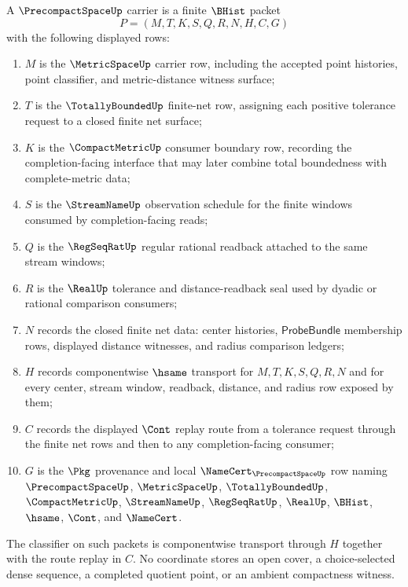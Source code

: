 \begin{definition}
\label{def:precompact-space-carrier}
A $\PrecompactSpaceUp$ carrier is a finite $\BHist$ packet
$$
P=(M,T,K,S,Q,R,N,H,C,G)
$$
with the following displayed rows:
\begin{enumerate}
\item $M$ is the $\MetricSpaceUp$ carrier row, including the accepted point histories, point classifier, and metric-distance witness surface;
\item $T$ is the $\TotallyBoundedUp$ finite-net row, assigning each positive tolerance request to a closed finite net surface;
\item $K$ is the $\CompactMetricUp$ consumer boundary row, recording the completion-facing interface that may later combine total boundedness with complete-metric data;
\item $S$ is the $\StreamNameUp$ observation schedule for the finite windows consumed by completion-facing reads;
\item $Q$ is the $\RegSeqRatUp$ regular rational readback attached to the same stream windows;
\item $R$ is the $\RealUp$ tolerance and distance-readback seal used by dyadic or rational comparison consumers;
\item $N$ records the closed finite net data: center histories, $\mathsf{ProbeBundle}$ membership rows, displayed distance witnesses, and radius comparison ledgers;
\item $H$ records componentwise $\hsame$ transport for $M,T,K,S,Q,R,N$ and for every center, stream window, readback, distance, and radius row exposed by them;
\item $C$ records the displayed $\Cont$ replay route from a tolerance request through the finite net rows and then to any completion-facing consumer;
\item $G$ is the $\Pkg$ provenance and local $\NameCert_{\PrecompactSpaceUp}$ row naming $\PrecompactSpaceUp$, $\MetricSpaceUp$, $\TotallyBoundedUp$, $\CompactMetricUp$, $\StreamNameUp$, $\RegSeqRatUp$, $\RealUp$, $\BHist$, $\hsame$, $\Cont$, and $\NameCert$.
\end{enumerate}
The classifier on such packets is componentwise transport through $H$ together with the route replay in $C$. No coordinate stores an open cover, a choice-selected dense sequence, a completed quotient point, or an ambient compactness witness.
\end{definition}

